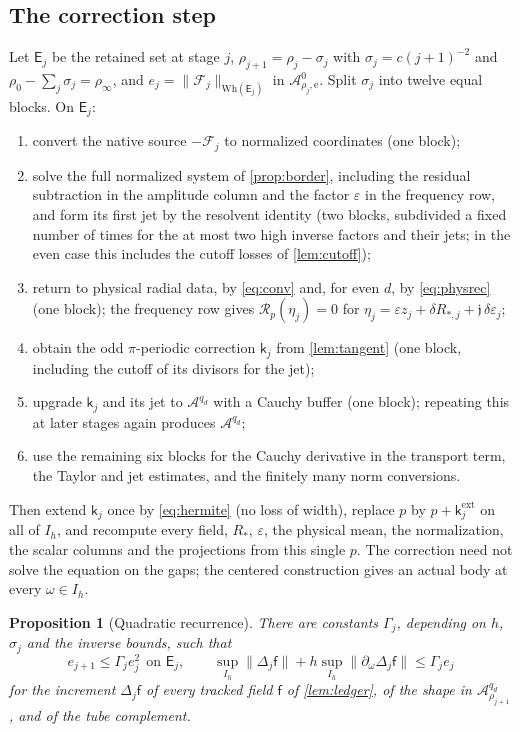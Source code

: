 \documentclass[11pt]{amsart}
\numberwithin{equation}{section}
\newtheorem{proposition}[theorem]{Proposition}
\theoremstyle{definition}
\theoremstyle{remark}
\newcommand{\eps}{\varepsilon}
\newcommand{\norm}[1]{\lVert #1\rVert}
\newcommand{\Wn}{\mathcal A}
\newcommand{\cR}{\mathcal R}
\newcommand{\cF}{\mathcal F}
\begin{document}
\subsection{The correction step}
Let $\mathsf E_j$ be the retained set at stage $j$, $\rho_{j+1}=\rho_j-\sigma_j$ with $\sigma_j=c(j+1)^{-2}$ and $\rho_0-\sum_j\sigma_j=\rho_\infty$, and $e_j=\norm{\cF_j}_{\mathrm{Wh}(\mathsf E_j)}$ in $\Wn^0_{\rho_j,\mathrm e}$. Split $\sigma_j$ into twelve equal blocks. On $\mathsf E_j$:
\begin{enumerate}[label=(\arabic*)]
\item convert the native source $-\cF_j$ to normalized coordinates (one block);
\item solve the full normalized system of \cref{prop:border}, including the residual subtraction in the amplitude column and the factor $\eps$ in the frequency row, and form its first jet by the resolvent identity (two blocks, subdivided a fixed number of times for the at most two high inverse factors and their jets; in the even case this includes the cutoff losses of \cref{lem:cutoff});
\item return to physical radial data, by \eqref{eq:conv} and, for even $d$, by \eqref{eq:physrec} (one block); the frequency row gives $\cR_p(\eta_j)=0$ for $\eta_j=\eps z_j+\delta R_{*,j}+\mathfrak j\,\delta\eps_j$;
\item obtain the odd $\pi$-periodic correction $\mathsf k_j$ from \cref{lem:tangent} (one block, including the cutoff of its divisors for the jet);
\item upgrade $\mathsf k_j$ and its jet to $\Wn^{q_d}$ with a Cauchy buffer (one block); repeating this at later stages again produces $\Wn^{q_d}$;
\item use the remaining six blocks for the Cauchy derivative in the transport term, the Taylor and jet estimates, and the finitely many norm conversions.
\end{enumerate}
Then extend $\mathsf k_j$ once by \eqref{eq:hermite} (no loss of width), replace $p$ by $p+\mathsf k_j^{\mathrm{ext}}$ on all of $I_h$, and recompute every field, $R_*$, $\eps$, the physical mean, the normalization, the scalar columns and the projections from this single $p$. The correction need not solve the equation on the gaps; the centered construction gives an actual body at every $\omega\in I_h$.

\begin{proposition}[Quadratic recurrence]\label{prop:recurrence}
There are constants $\Gamma_j$, depending on $h$, $\sigma_j$ and the inverse bounds, such that
\begin{equation}\label{eq:rec}
e_{j+1}\le\Gamma_je_j^2\ \ \text{on }\mathsf E_j,\qquad\sup_{I_h}\norm{\Delta_j\mathsf f}+h\sup_{I_h}\norm{\partial_\omega\Delta_j\mathsf f}\le\Gamma_je_j
\end{equation}
for the increment $\Delta_j\mathsf f$ of every tracked field $\mathsf f$ of \cref{lem:ledger}, of the shape in $\Wn^{q_d}_{\rho_{j+1}}$, and of the tube complement.
\end{proposition}
\end{document}

